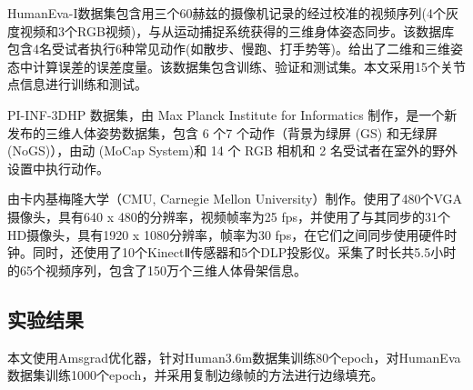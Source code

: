 HumanEva-I数据集包含用三个60赫兹的摄像机记录的经过校准的视频序列(4个灰度视频和3个RGB视频)，与从运动捕捉系统获得的三维身体姿态同步。该数据库包含4名受试者执行6种常见动作(如散步、慢跑、打手势等)。给出了二维和三维姿态中计算误差的误差度量。该数据集包含训练、验证和测试集。本文采用15个关节点信息进行训练和测试。

PI-INF-3DHP 数据集，由 Max Planck Institute for Informatics 制作，是一个新发布的三维人体姿势数据集，包含 6 个7 个动作（背景为绿屏 (GS) 和无绿屏 (NoGS)），由动 (MoCap System)和 14 个 RGB 相机和 2 名受试者在室外的野外设置中执行动作。

由卡内基梅隆大学（CMU, Carnegie Mellon University）制作。使用了480个VGA摄像头，具有640 x 480的分辨率，视频帧率为25 fps，并使用了与其同步的31个HD摄像头，具有1920 x 1080分辨率，帧率为30 fps，在它们之间同步使用硬件时钟。同时，还使用了10个KinectⅡ传感器和5个DLP投影仪。采集了时长共5.5小时的65个视频序列，包含了150万个三维人体骨架信息。

\subsection{实验结果}{}
本文使用Amsgrad优化器，针对Human3.6m数据集训练80个epoch，对HumanEva数据集训练1000个epoch，并采用复制边缘帧的方法进行边缘填充。

